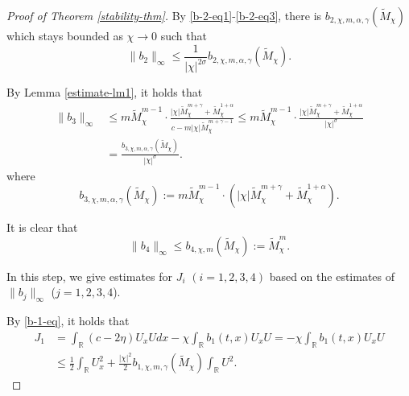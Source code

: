 \documentclass[11pt]{article} %
\theoremstyle{remark}
\theoremstyle{remark}
\numberwithin{equation}{section}
\numberwithin{figure}{section}
\numberwithin{table}{section}
\newcommand\RR{\ensuremath{\mathbb{R}}}
\begin{document}
\begin{proof}[Proof of Theorem \ref{stability-thm}]
\smallskip

By \eqref{b-2-eq1}-\eqref{b-2-eq3}, there is $b_{2,\chi,m,\alpha,\gamma}(\widetilde M_\chi)$ which stays bounded as $\chi\to 0$ such that
\begin{equation}
\label{b-2-eq}
\|b_2\|_\infty\le \frac{1}{|\chi|^{2\sigma}} b_{2,\chi,m,\alpha,\gamma}(\widetilde M_\chi).
\end{equation}

\smallskip

By Lemma \ref{estimate-lm1}, it holds that
\begin{align}
\label{b-3-eq}
\|b_3\|_\infty &\le  m \widetilde M_{\chi}^{m-1} \cdot  \frac{|\chi| \widetilde M_\chi^{m+\gamma} +\widetilde M_\chi^{1+\alpha}}{c- m |\chi| \widetilde M^{m+\gamma-1}_\chi } \le   m \widetilde M_{\chi}^{m-1} \cdot  \frac{|\chi| \widetilde M_\chi^{m+\gamma} +\widetilde M_\chi^{1+\alpha}}{|\chi|^\sigma }\nonumber\\
&=\frac{b_{3,\chi,m,\alpha,\gamma}(\widetilde M_\chi)}{|\chi|^\sigma} .
\end{align}
where
$$
b_{3,\chi,m,\alpha,\gamma}(\widetilde M_\chi):=m \widetilde M_{\chi}^{m-1} \cdot (|\chi| \widetilde M_\chi^{m+\gamma} +\widetilde M_\chi^{1+\alpha}).
$$


It  is clear that
\begin{equation}
\label{b-4-eq}
\|b_4\|_\infty\le b_{4,\chi,m}(\widetilde M_\chi):=\widetilde  M_{\chi}^m.
\end{equation}


\smallskip

 In this step, we  give estimates for $J_i$ $(i=1,2,3,4)$ based on the estimates of $\|b_j\|_\infty$ ($j=1,2,3,4$).

\smallskip


 By \eqref{b-1-eq}, it holds that
\begin{align}
\label{J-1-eq}
J_1& =\int_{\RR} (c-2\eta) U_x Udx -\chi \int_{\RR} b_1(t,x) U_x U=-\chi \int_{\RR} b_1(t, x) U_xU\nonumber\\
&\le \frac{1}{2}\int_{\RR} U_x^2 + \frac{  |\chi|^{2 }}{2} b_{1,\chi,m,\gamma} (\widetilde M_\chi)\int_{\RR}  U^2.
\end{align}
\smallskip




\end{proof}
\end{document}
